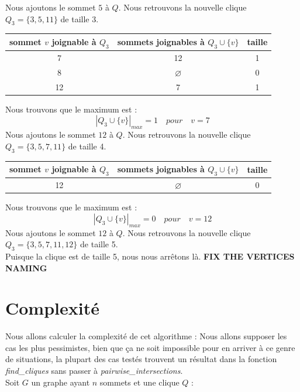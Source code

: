 \documentclass{article}
\begin{document}
Nous ajoutons le sommet $5$ à $Q$. Nous retrouvons la nouvelle clique \\
$Q_3=\{3, 5, 11\}$ de taille 3.
\begin{center}
  \begin{tabular}{|c|c|c|}
    \hline
    sommet $v$ joignable à $Q_3$ & sommets joignables à $Q_3\cup\{v\}$ & taille \\ \hline
    \hline
    7 	& 12 	            & 1 \\ \hline
    8 	& $ \varnothing$ 	& 0 \\ \hline
    12 	& 7 	            & 1 \\ \hline
  \end{tabular}
\end{center}
Nous trouvons que le maximum est :
\begin{displaymath}
  |Q_3 \cup \{v\}|_{max}=1 \quad pour \quad v=7
\end{displaymath}
Nous ajoutons le sommet $12$ à $Q$. Nous retrouvons la nouvelle clique \\
$Q_3=\{3, 5, 7, 11\}$ de taille 4.
\begin{center}
  \begin{tabular}{|c|c|c|}
    \hline
    sommet $v$ joignable à $Q_3$ & sommets joignables à $Q_3\cup\{v\}$ & taille \\ \hline
    \hline
    12    & $\varnothing$ & 0 \\ \hline
  \end{tabular}
\end{center}
Nous trouvons que le maximum est :
\begin{displaymath}
  |Q_3 \cup \{v\}|_{max}=0 \quad pour \quad v=12
\end{displaymath}
Nous ajoutons le sommet $12$ à $Q$. Nous retrouvons la nouvelle clique \\
$Q_3=\{3, 5, 7, 11, 12\}$ de taille 5.\\
Puisque la clique est de taille 5, nous nous arrêtons là.
\textbf{FIX THE VERTICES NAMING}
\section{Complexité}
Nous allons calculer la complexité de cet algorithme :
Nous allons supposer les cas les plus pessimistes, bien que ça ne soit impossible pour en arriver
à ce genre de situations, la plupart des cas testés trouvent un résultat dans la fonction
\textit{find\_cliques} sans passer à \textit{pairwise\_intersections}.\\
Soit $G$ un graphe ayant $n$ sommets et une clique $Q$ :
\end{document}
